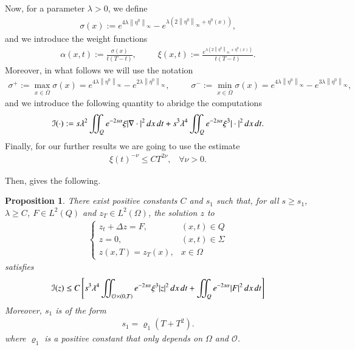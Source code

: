 \documentclass[preprint,1p]{elsarticle}
\newcommand{\norm}[2]{\left\|#1\right\|_{#2}}
\newcommand{\intd}{\displaystyle\int \kern -7pt \int}
\newtheorem{proposition}{\bf Proposition}[section]
\begin{document}
Now, for a parameter $\lambda>0$, we define 
\begin{align*}
	\sigma(x):= e^{4\lambda\norm{\eta^0}{\infty}}-e^{\lambda\left(2\norm{\eta^0}{\infty}+\eta^0(x)\right)},
\end{align*}
and we introduce the weight functions
\begin{align}\label{weight}
	\alpha(x,t):=\frac{\sigma(x)}{t(T-t)}, \;\;\;\;\;\;\;\;\; \xi(x,t):=\frac{e^{\lambda\left(2\norm{\eta^0}{\infty}+\eta^0(x)\right)}}{t(T-t)}.
\end{align}
Moreover, in what follows we will use the notation 
\begin{align}\label{notation_alpha}
	\sigma^+:= \max_{x\in\overline{\Omega}}\sigma(x)=e^{4\lambda\norm{\eta^0}{\infty}}-e^{2\lambda\norm{\eta^0}{\infty}}, \;\;\;\;\;\;\;\;\; \sigma^-:= \min_{x\in\overline{\Omega}}\sigma(x)=e^{4\lambda\norm{\eta^0}{\infty}}-e^{3\lambda\norm{\eta^0}{\infty}}, 
\end{align}
and we introduce the following quantity to abridge the computations
\begin{align*}
	\mathcal I(\cdot):= s\lambda^2\intd_Q e^{-2s\alpha}\xi|\nabla \cdot|^2\,dx\,dt + s^3\lambda^4\intd_Q e^{-2s\alpha}\xi^3|\cdot|^2\,dx\,dt.
\end{align*}	
Finally, for our further results we are going to use the estimate
\begin{align}\label{xi_est}
	\xi(t)^{-\nu}\leq CT^{2\nu},\;\;\;\forall\nu>0.
\end{align}

Then, \cite[Lemma 1.3]{fernandez2006global} gives the following.

\begin{proposition}\label{carleman z_prop} 
There exist positive constants $C$ and $s_1$ such that, for all $s\geq s_1$, $\lambda\geq C$, $F\in L^2(Q)$ and $z_T\in L^2(\Omega)$, the solution $z$ to 
\begin{align}\label{syst_z}
	\begin{cases}
		z_t+\Delta z = F, & (x,t)\in Q
		\\
		z=0, & (x,t)\in\Sigma
		\\
		z(x,T) = z_T(x), & x\in \Omega
	\end{cases}
\end{align}
satisfies
\begin{align}\label{carleman z}
	\mathcal{I}(z) \leq C \left[s^3\lambda^4\intd_{\mathcal O\times(0,T)} e^{-2s\alpha}\xi^3 |z|^2\,dx\,dt + \intd_Q e^{-2s\alpha}|F|^2\,dx\,dt\right]
\end{align}
Moreover, $s_1$ is of the form 
\begin{align}\label{e6s2}
	s_1 = \varrho_1\left(T+T^2\right).
\end{align}
where $\varrho_1$ is a positive constant that only depends on $\Omega$ and $\mathcal O$.
\end{proposition}
\end{document}
